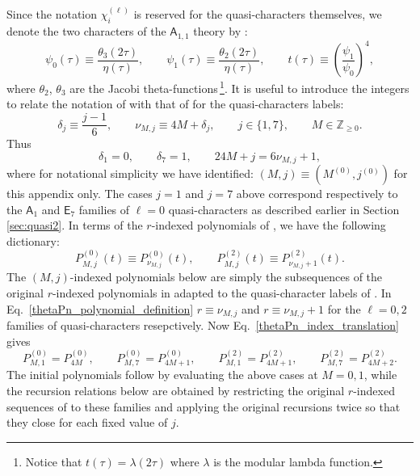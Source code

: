 \documentclass[11pt]{article}
\newcommand\be{\begin{equation}}
\newcommand\ee{\end{equation}}
\newcommand\mA{{\mathsf A}}
\newcommand\mE{{\mathsf E}}
\begin{document}
Since the notation $\chi_i^{(\ell)}$ is reserved for the quasi-characters themselves, we denote the two characters of the $\mA_{1,1}$ theory by \cite{Chandra:2018pjq}:
\begin{equation}
    \psi_0(\tau)
    \equiv
    \frac{\theta_3(2\tau)}{\eta(\tau)},
    \qquad
    \psi_1(\tau)
    \equiv
    \frac{\theta_2(2\tau)}{\eta(\tau)},
    \qquad
    t(\tau)
    \equiv
    \left(\frac{\psi_1}{\psi_0}\right)^4
    ,
    \label{thetaPn_basic_defs}
\end{equation}
where $\theta_2$, $\theta_3$ are the Jacobi theta-functions\,\footnote{Notice that $t(\tau)=\lambda(2\tau)$ where $\lambda$ is the modular lambda function.}. It is useful to introduce the integers to relate the notation of \cite{Chandra:2018pjq} with that of \cite{Das:2025gto} for the quasi-characters labels:
\begin{equation}
    \delta_j
    \equiv
    \frac{j-1}{6},
    \qquad
    \nu_{M,j}
    \equiv
    4M+\delta_j,
    \qquad
    j\in\{1,7\},
    \qquad
    M\in\mathbb{Z}_{\geq0}.
    \label{thetaPn_index_translation}
\end{equation}
Thus
\begin{equation}
    \delta_1=0,
    \qquad
    \delta_7=1,
    \qquad
    24M+j=6\nu_{M,j}+1,
    \label{thetaPn_index_relations}
\end{equation}
where for notational simplicity we have identified: $(M,j)\equiv (M^{(0)},j^{(0)})$ for this appendix only. The cases \(j=1\) and \(j=7\) above correspond respectively to the \(\mA_1\) and \(\mE_7\) families of \(\ell=0\) quasi-characters as described earlier in Section \ref{sec:quasi2}. In terms of the \(r\)-indexed polynomials of \cite{Chandra:2018pjq}, we have the following dictionary:
\be
 P^{(0)}_{M,j}(t)
 \equiv P^{(0)}_{\nu_{M,j}}(t),
 \qquad
 P^{(2)}_{M,j}(t)
 \equiv P^{(2)}_{\nu_{M,j}+1}(t).
\label{thetaPn_polynomial_definition}
\ee
The \((M,j)\)-indexed polynomials below are simply the subsequences of the
original \(r\)-indexed polynomials in \cite{Chandra:2018pjq} adapted to the quasi-character labels of \cite{Das:2025gto}. In Eq.~\eqref{thetaPn_polynomial_definition} $r\equiv \nu_{M,j}$ and $r\equiv \nu_{M,j}+1$ for the $\ell=0, 2$ families of quasi-characters resepctively. Now Eq.~\eqref{thetaPn_index_translation} gives
\be
 P^{(0)}_{M,1}= P^{(0)}_{4M},
 \qquad
 P^{(0)}_{M,7}= P^{(0)}_{4M+1},
 \qquad
 P^{(2)}_{M,1}= P^{(2)}_{4M+1},
 \qquad
 P^{(2)}_{M,7}= P^{(2)}_{4M+2}.
\ee
The initial polynomials follow by evaluating the above cases at
\(M=0,1\), while the recursion relations below are obtained by restricting the original \(r\)-indexed sequences of \cite{Chandra:2018pjq} to these families and applying the original recursions twice so that they close for each fixed value of \(j\).
\end{document}
